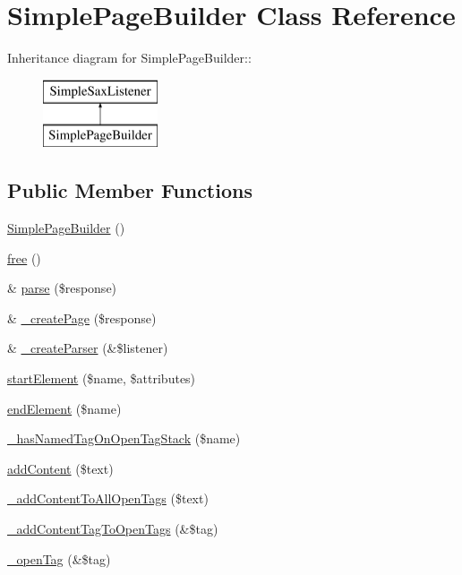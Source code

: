 \hypertarget{class_simple_page_builder}{
\section{SimplePageBuilder Class Reference}
\label{class_simple_page_builder}
}
Inheritance diagram for SimplePageBuilder::\begin{figure}[H]
\begin{center}
\leavevmode
\includegraphics[height=2cm]{class_simple_page_builder}
\end{center}
\end{figure}
\subsection*{Public Member Functions}
\begin{DoxyCompactItemize}
\item 
\hyperlink{class_simple_page_builder_aa78adff50b24bb29981c9c655905b10c}{SimplePageBuilder} ()
\item 
\hyperlink{class_simple_page_builder_ae4ebd7ba464976aeea6445eec30253e5}{free} ()
\item 
\& \hyperlink{class_simple_page_builder_a9e5064b871d06f5b601184d7c3ca1567}{parse} (\$response)
\item 
\& \hyperlink{class_simple_page_builder_afd4eea32d22fe5fb09470d82665879d2}{\_\-createPage} (\$response)
\item 
\& \hyperlink{class_simple_page_builder_af61f0142faa51a5636b4a7f1de3e069a}{\_\-createParser} (\&\$listener)
\item 
\hyperlink{class_simple_page_builder_a7b40a556918f88bd570eed376ad36b7e}{startElement} (\$name, \$attributes)
\item 
\hyperlink{class_simple_page_builder_a9c074127728a8588dac8dbf5c0f05439}{endElement} (\$name)
\item 
\hyperlink{class_simple_page_builder_abb0453d71690ec08dd4286aae3d1d83b}{\_\-hasNamedTagOnOpenTagStack} (\$name)
\item 
\hyperlink{class_simple_page_builder_a324ad1e5d69787482a64319a095e09c7}{addContent} (\$text)
\item 
\hyperlink{class_simple_page_builder_aa810b100737abf41b2f93439d4f3dfa4}{\_\-addContentToAllOpenTags} (\$text)
\item 
\hyperlink{class_simple_page_builder_ab4a16684ccda1f0d1241eb95f693efad}{\_\-addContentTagToOpenTags} (\&\$tag)
\item 
\hyperlink{class_simple_page_builder_a68669a93a330af377812cc921efc94ac}{\_\-openTag} (\&\$tag)
\end{DoxyCompactItemize}
